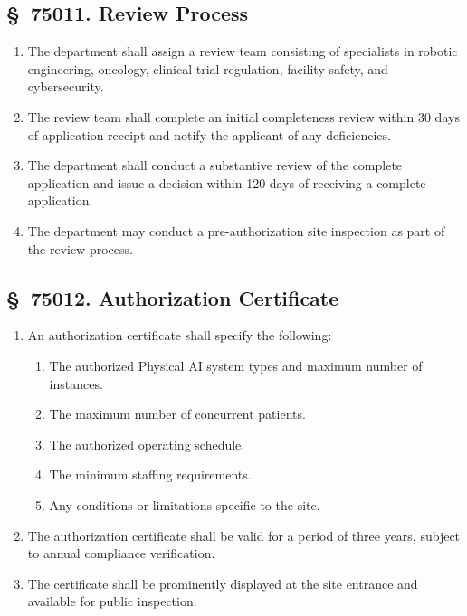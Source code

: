 \documentclass[11pt,letterpaper]{article}
\begin{document}
\subsection{\S~75011. Review Process}

\begin{enumerate}[label=(\alph*)]
\item The department shall assign a review team consisting of specialists in
  robotic engineering, oncology, clinical trial regulation, facility safety,
  and cybersecurity.

\item The review team shall complete an initial completeness review within 30
  days of application receipt and notify the applicant of any deficiencies.

\item The department shall conduct a substantive review of the complete
  application and issue a decision within 120 days of receiving a complete
  application.

\item The department may conduct a pre-authorization site inspection as part
  of the review process.
\end{enumerate}

\subsection{\S~75012. Authorization Certificate}

\begin{enumerate}[label=(\alph*)]
\item An authorization certificate shall specify the following:
  \begin{enumerate}[label=(\arabic*)]
  \item The authorized Physical AI system types and maximum number of instances.
  \item The maximum number of concurrent patients.
  \item The authorized operating schedule.
  \item The minimum staffing requirements.
  \item Any conditions or limitations specific to the site.
  \end{enumerate}

\item The authorization certificate shall be valid for a period of three years,
  subject to annual compliance verification.

\item The certificate shall be prominently displayed at the site entrance and
  available for public inspection.
\end{enumerate}
\end{document}
